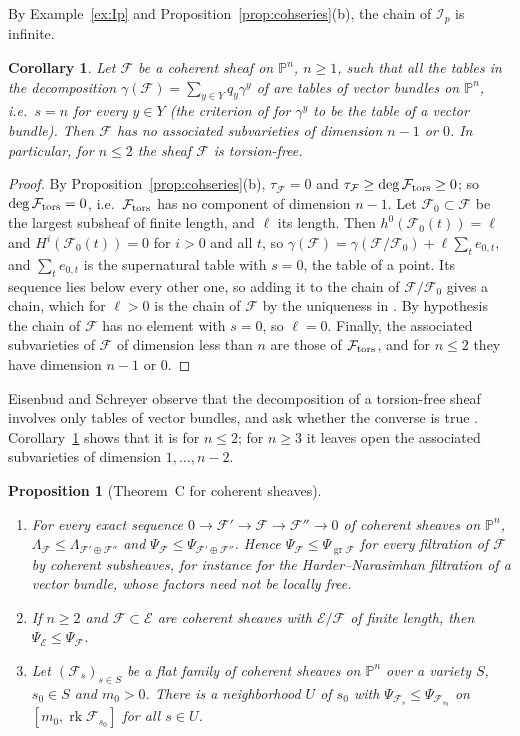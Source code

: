 \documentclass[11pt]{amsart}
\newtheorem{proposition}[theorem]{Proposition}
\newtheorem{corollary}[theorem]{Corollary}
\theoremstyle{definition}
\theoremstyle{remark}
\newcommand{\PP}{\mathbb{P}}
\newcommand{\cE}{\mathcal{E}}
\newcommand{\cF}{\mathcal{F}}
\newcommand{\cI}{\mathcal{I}}
\DeclareMathOperator{\rk}{rk}
\DeclareMathOperator{\gr}{gr}
\begin{document}
By Example~\ref{ex:Ip} and Proposition~\ref{prop:cohseries}(b), the chain of $\cI_p$ is infinite.

\begin{corollary}\label{cor:ESquestion}
Let $\cF$ be a coherent sheaf on $\PP^n$, $n\ge1$, such that all the tables in the decomposition $\gamma(\cF)=\sum_{y\in Y}q_y\gamma^y$ of \cite[Thm.~0.2]{ES10} are tables of vector bundles on $\PP^n$, i.e.\ $s=n$ for every $y\in Y$ (the criterion of \cite{ES10} for $\gamma^y$ to be the table of a vector bundle). Then $\cF$ has no associated subvarieties of dimension $n-1$ or $0$. In particular, for $n\le2$ the sheaf $\cF$ is torsion-free.
\end{corollary}

\begin{proof}
By Proposition~\ref{prop:cohseries}(b), $\tau_\cF=0$ and $\tau_\cF\ge\deg\cF_{\rm tors}\ge0$; so $\deg\cF_{\rm tors}=0$, i.e.\ $\cF_{\rm tors}$ has no component of dimension $n-1$. Let $\cF_0\subset\cF$ be the largest subsheaf of finite length, and $\ell$ its length. Then $h^0(\cF_0(t))=\ell$ and $H^i(\cF_0(t))=0$ for $i>0$ and all $t$, so $\gamma(\cF)=\gamma(\cF/\cF_0)+\ell\sum_te_{0,t}$, and $\sum_te_{0,t}$ is the supernatural table with $s=0$, the table of a point. Its sequence lies below every other one, so adding it to the chain of $\cF/\cF_0$ gives a chain, which for $\ell>0$ is the chain of $\cF$ by the uniqueness in \cite[Thm.~0.2]{ES10}. By hypothesis the chain of $\cF$ has no element with $s=0$, so $\ell=0$. Finally, the associated subvarieties of $\cF$ of dimension less than $n$ are those of $\cF_{\rm tors}$, and for $n\le2$ they have dimension $n-1$ or $0$.
\end{proof}

Eisenbud and Schreyer observe that the decomposition of a torsion-free sheaf involves only tables of vector bundles, and ask whether the converse is true \cite[after Thm.~0.2]{ES10}. Corollary~\ref{cor:ESquestion} shows that it is for $n\le2$; for $n\ge3$ it leaves open the associated subvarieties of dimension $1,\dots,n-2$.

\begin{proposition}[Theorem~C for coherent sheaves]\label{prop:cohC}
\begin{enumerate}[label=\textup{(\alph*)}]
\item For every exact sequence $0\to\cF'\to\cF\to\cF''\to0$ of coherent sheaves on $\PP^n$, $\Lambda_\cF\le\Lambda_{\cF'\oplus\cF''}$ and $\Psi_\cF\le\Psi_{\cF'\oplus\cF''}$. Hence $\Psi_\cF\le\Psi_{\gr\cF}$ for every filtration of $\cF$ by coherent subsheaves, for instance for the Harder--Narasimhan filtration of a vector bundle, whose factors need not be locally free.
\item If $n\ge2$ and $\cF\subset\cE$ are coherent sheaves with $\cE/\cF$ of finite length, then $\Psi_\cE\le\Psi_\cF$.
\item Let $(\cF_s)_{s\in S}$ be a flat family of coherent sheaves on $\PP^n$ over a variety $S$, $s_0\in S$ and $m_0>0$. There is a neighborhood $U$ of $s_0$ with $\Psi_{\cF_s}\le\Psi_{\cF_{s_0}}$ on $[m_0,\rk\cF_{s_0}]$ for all $s\in U$.
\end{enumerate}
\end{proposition}
\end{document}
